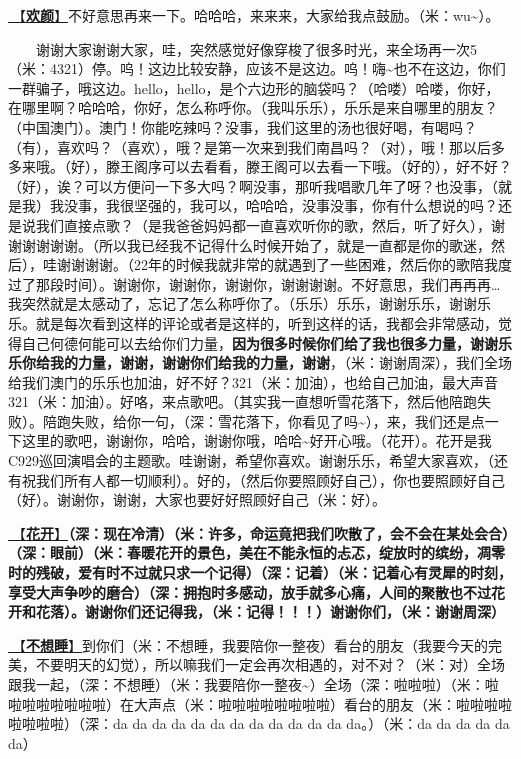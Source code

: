 \documentclass[]{ctexbook}
\begin{document}
\hyperref[happy-face]{🎵【\textbf{欢颜}】}不好意思再来一下。哈哈哈，来来来，大家给我点鼓励。（米：wu\textasciitilde）。

  谢谢大家谢谢大家，哇，突然感觉好像穿梭了很多时光，来全场再一次5（米：4321）停。呜！这边比较安静，应该不是这边。呜！嗨\textasciitilde 也不在这边，你们一群骗子，哦这边。hello，hello，是个六边形的脑袋吗？（哈喽）哈喽，你好，在哪里啊？哈哈哈，你好，怎么称呼你。（我叫乐乐），乐乐是来自哪里的朋友？（中国澳门）。澳门！你能吃辣吗？没事，我们这里的汤也很好喝，有喝吗？（有），喜欢吗？（喜欢），哦？是第一次来到我们南昌吗？（对），哦！那以后多多来哦。（好），滕王阁序可以去看看，滕王阁可以去看一下哦。（好的），好不好？（好），诶？可以方便问一下多大吗？啊没事，那听我唱歌几年了呀？也没事，（就是我）我没事，我很坚强的，我可以，哈哈哈，没事没事，你有什么想说的吗？还是说我们直接点歌？（是我爸爸妈妈都一直喜欢听你的歌，然后，听了好久），谢谢谢谢谢谢。（所以我已经我不记得什么时候开始了，就是一直都是你的歌迷，然后），哇谢谢谢谢。（22年的时候我就非常的就遇到了一些困难，然后你的歌陪我度过了那段时间）。谢谢你，谢谢你，谢谢你，谢谢谢谢。不好意思，我们再再再\ldots 我突然就是太感动了，忘记了怎么称呼你了。（乐乐）乐乐，谢谢乐乐，谢谢乐乐。就是每次看到这样的评论或者是这样的，听到这样的话，我都会非常感动，觉得自己何德何能可以去给你们力量，\textbf{因为很多时候你们给了我也很多力量，谢谢乐乐你给我的力量，谢谢，谢谢你们给我的力量，谢谢}，（米：谢谢周深），我们全场给我们澳门的乐乐也加油，好不好？321（米：加油），也给自己加油，最大声音321（米：加油）。好咯，来点歌吧。（其实我一直想听雪花落下，然后他陪跑失败）。陪跑失败，给你一句，（深：雪花落下，你看见了吗\textasciitilde），来，我们还是点一下这里的歌吧，谢谢你，哈哈，谢谢你哦，哈哈\textasciitilde 好开心哦。（花开）。花开是我C929巡回演唱会的主题歌。哇谢谢，希望你喜欢。谢谢乐乐，希望大家喜欢，（还有祝我们所有人都一切顺利）。好的，（然后你要照顾好自己），你也要照顾好自己（好）。谢谢你，谢谢，大家也要好好照顾好自己（米：好）。

\hyperref[bloom]{🎵【\textbf{花开}】}\textbf{（深：现在冷清）（米：许多，命运竟把我们吹散了，会不会在某处会合）（深：眼前）（米：春暖花开的景色，美在不能永恒的忐忑，绽放时的缤纷，凋零时的残破，爱有时不过就只求一个记得）（深：记着）（米：记着心有灵犀的时刻，享受大声争吵的磨合）（深：拥抱时多感动，放手就多心痛，人间的聚散也不过花开和花落）。谢谢你们还记得我，（米：记得！！！）谢谢你们，（米：谢谢周深）}

\hyperref[donot-want-to-sleep]{🎵【\textbf{不想睡}】}到你们（米：不想睡，我要陪你一整夜）看台的朋友（我要今天的完美，不要明天的幻觉），所以嘛我们一定会再次相遇的，对不对？（米：对）全场跟我一起，（深：不想睡）（米：我要陪你一整夜\textasciitilde）全场（深：啦啦啦）（米：啦啦啦啦啦啦啦啦）在大声点（米：啦啦啦啦啦啦啦啦）看台的朋友（米：啦啦啦啦啦啦啦啦）（深：da da da da da da da da da da da da da。）（米：da da da da da da）
\end{document}
